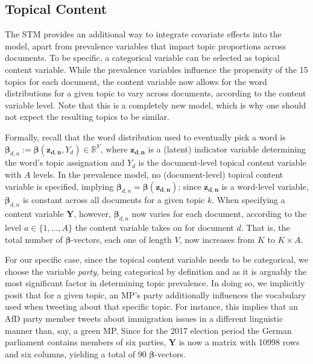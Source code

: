 \subsection{Topical Content}
\label{Topical Content}

The STM provides an additional way to integrate covariate effects into the model, apart from prevalence variables that impact topic proportions across documents. To be specific, a categorical variable can be selected as topical content variable. While the prevalence variables influence the propensity of the 15 topics for each document, the content variable now allows for the word distributions for a given topic to vary across documents, according to the content variable level. Note that this is a completely new model, which is why one should not expect the resulting topics to be similar. 

Formally, recall that the word distribution used to eventually pick a word is $\boldsymbol{\beta}_{d,n} := \boldsymbol{\beta}(\boldsymbol{z_{d,n}}, Y_d) \in \mathbb{R}^V$, where $\boldsymbol{z_{d,n}}$ is a (latent) indicator variable determining the word's topic assignation and $Y_{d}$ is the document-level topical content variable with $A$ levels. In the prevalence model, no (document-level) topical content variable is specified, implying $\boldsymbol{\beta}_{d,n} = \boldsymbol{\beta}(\boldsymbol{z_{d,n}})$; since $\boldsymbol{z_{d,n}}$ is a word-level variable, $\boldsymbol{\beta}_{d,n}$ is constant across all documents for a given topic $k$. When specifying a content variable $\boldsymbol{Y}$, however, $\boldsymbol{\beta}_{d,n}$ now varies for each document, according to the level $a \in \{1, ..., A\}$ the content variable takes on for document $d$. That is, the total number of $\boldsymbol{\beta}$-vectors, each one of length $V$, now increases from $K$ to $K \times A$.

For our specific case, since the topical content variable needs to be categorical, we choose the variable \textit{party}, being categorical by definition and as it  is arguably the most significant factor in determining topic prevalence. In doing so, we implicitly posit that for a given topic, an MP's party additionally influences the vocabulary used when tweeting about that specific topic. For instance, this implies that an AfD party member tweets about immigration issues in a different linguistic manner than, say, a green MP. Since for the 2017 election period the German parliament contains members of six parties, $\boldsymbol{Y}$ is now a matrix with 10998 rows and six columns, yielding a total of 90 $\boldsymbol{\beta}$-vectors.

